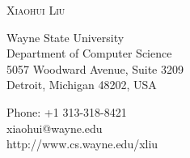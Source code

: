 
\begin{center}

%

\textsc{\Large Xiaohui Liu}\\[1cm]

%

\begin{minipage}{0.4\textwidth}
\begin{flushleft}%
Wayne State University \\
Department of Computer Science \\
5057 Woodward Avenue, Suite 3209 \\
Detroit, Michigan 48202, USA
\end{flushleft}
\end{minipage}
\begin{minipage}{0.4\textwidth}
\begin{flushright} %
Phone: +1 313-318-8421 \\
xiaohui@wayne.edu \\
http://www.cs.wayne.edu/xliu
\end{flushright}
\end{minipage}



\end{center}
